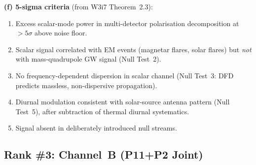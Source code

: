 \documentclass[11pt]{article}
\theoremstyle{definition}
\theoremstyle{remark}
\begin{document}
\begin{tcolorbox}[colback=green!5!white, colframe=green!60!black,
  title=\textbf{RANK \#2: LIGO 6TH CHANNEL (O3 ARCHIVAL)}]
\textbf{(f) 5-sigma criteria} (from W3i7 Theorem~2.3):
\begin{enumerate}[nosep]
\item Excess scalar-mode power in multi-detector polarisation
  decomposition at $>5\sigma$ above noise floor.
\item Scalar signal correlated with EM events (magnetar flares, solar
  flares) but \emph{not} with mass-quadrupole GW signal (Null Test~2).
\item No frequency-dependent dispersion in scalar channel
  (Null Test~3: DFD predicts massless, non-dispersive propagation).
\item Diurnal modulation consistent with solar-source antenna pattern
  (Null Test~5), after subtraction of thermal diurnal systematics.
\item Signal absent in deliberately introduced null streams.
\end{enumerate}

\end{tcolorbox}


\subsection{Rank \#3: Channel~B (P11+P2 Joint)}
\label{ssec:rank3}
\end{document}

